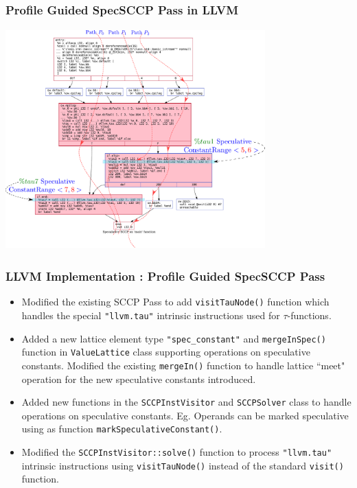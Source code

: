 \documentclass[aspectratio=169, compress]{beamer}
\begin{document}
\begin{frame}
	\frametitle{Profile Guided SpecSCCP Pass in LLVM}
	\centering
	\includegraphics[width=10cm, height=8.5cm]{dotfiles/specSCCP_HPSSA.dot.pdf}
\end{frame}

\begin{frame}
	\frametitle{LLVM Implementation : Profile Guided SpecSCCP Pass}
	\begin{itemize}
		\item Modified the existing SCCP Pass to add \texttt{visitTauNode()} function which handles the special \texttt{"llvm.tau"} intrinsic instructions used for $\tau$-functions.\footnotemark \pause
		\item Added a new lattice element type \texttt{"spec_constant"} and \texttt{mergeInSpec()} function in \texttt{ValueLattice} class supporting operations on speculative constants. Modified the existing \texttt{mergeIn()} function to handle lattice ``meet" operation for the new speculative constants introduced.  \pause
		\item Added new functions in the \texttt{SCCPInstVisitor} and \texttt{SCCPSolver} class to handle operations on speculative constants. Eg. Operands can be marked speculative using as function \texttt{markSpeculativeConstant()}. \pause
		\item Modified the \texttt{SCCPInstVisitor::solve()} function to process \texttt{"llvm.tau"} intrinsic instructions using \texttt{visitTauNode()} instead of the standard \texttt{visit()} function.
	\end{itemize}
	\tiny 
\end{frame}
\footnotesize
\end{document}
